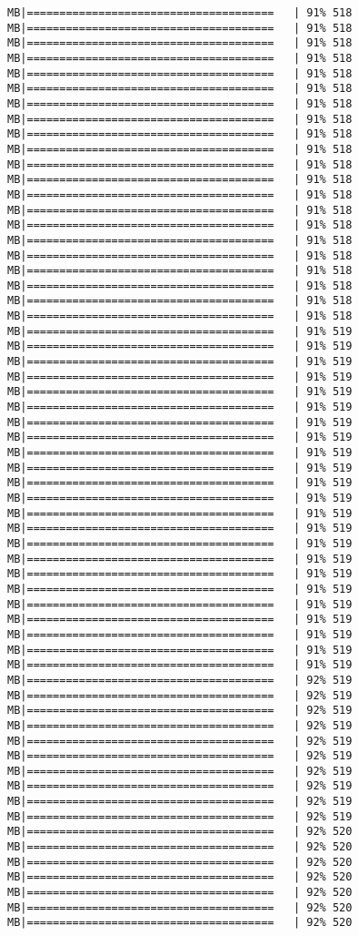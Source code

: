 \documentclass[
]{article}
\begin{document}
\begin{verbatim}
MB|======================================   | 91% 518 MB|======================================   | 91% 518 MB|======================================   | 91% 518 MB|======================================   | 91% 518 MB|======================================   | 91% 518 MB|======================================   | 91% 518 MB|======================================   | 91% 518 MB|======================================   | 91% 518 MB|======================================   | 91% 518 MB|======================================   | 91% 518 MB|======================================   | 91% 518 MB|======================================   | 91% 518 MB|======================================   | 91% 518 MB|======================================   | 91% 518 MB|======================================   | 91% 518 MB|======================================   | 91% 518 MB|======================================   | 91% 518 MB|======================================   | 91% 518 MB|======================================   | 91% 518 MB|======================================   | 91% 518 MB|======================================   | 91% 518 MB|======================================   | 91% 519 MB|======================================   | 91% 519 MB|======================================   | 91% 519 MB|======================================   | 91% 519 MB|======================================   | 91% 519 MB|======================================   | 91% 519 MB|======================================   | 91% 519 MB|======================================   | 91% 519 MB|======================================   | 91% 519 MB|======================================   | 91% 519 MB|======================================   | 91% 519 MB|======================================   | 91% 519 MB|======================================   | 91% 519 MB|======================================   | 91% 519 MB|======================================   | 91% 519 MB|======================================   | 91% 519 MB|======================================   | 91% 519 MB|======================================   | 91% 519 MB|======================================   | 91% 519 MB|======================================   | 91% 519 MB|======================================   | 91% 519 MB|======================================   | 91% 519 MB|======================================   | 91% 519 MB|======================================   | 92% 519 MB|======================================   | 92% 519 MB|======================================   | 92% 519 MB|======================================   | 92% 519 MB|======================================   | 92% 519 MB|======================================   | 92% 519 MB|======================================   | 92% 519 MB|======================================   | 92% 519 MB|======================================   | 92% 519 MB|======================================   | 92% 519 MB|======================================   | 92% 520 MB|======================================   | 92% 520 MB|======================================   | 92% 520 MB|======================================   | 92% 520 MB|======================================   | 92% 520 MB|======================================   | 92% 520 MB|======================================   | 92% 520 
\end{verbatim}
\end{document}
